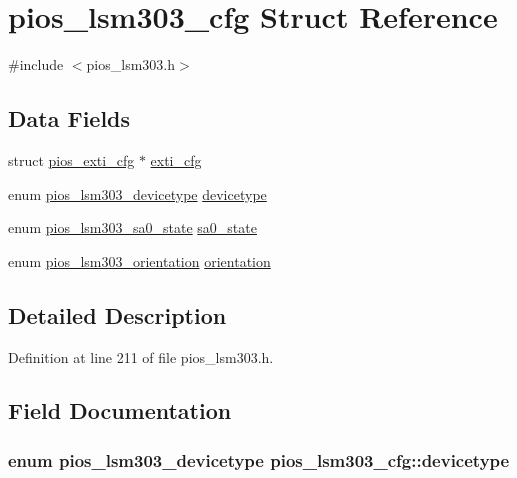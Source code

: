 \hypertarget{structpios__lsm303__cfg}{\section{pios\-\_\-lsm303\-\_\-cfg \-Struct \-Reference}
\label{structpios__lsm303__cfg}
}


{\ttfamily \#include $<$pios\-\_\-lsm303.\-h$>$}

\subsection*{\-Data \-Fields}
\begin{DoxyCompactItemize}
\item 
struct \hyperlink{structpios__exti__cfg}{pios\-\_\-exti\-\_\-cfg} $\ast$ \hyperlink{structpios__lsm303__cfg_a90c0ca7937453279f276d8adc5b7e82c}{exti\-\_\-cfg}
\item 
enum \hyperlink{group___p_i_o_s___l_s_m303_ga2657cfa22c98bd2d84ea7fed74fac52a}{pios\-\_\-lsm303\-\_\-devicetype} \hyperlink{structpios__lsm303__cfg_a5b16505db880f6b6b0c22b4dedb532bf}{devicetype}
\item 
enum \hyperlink{group___p_i_o_s___l_s_m303_ga73dd8a4c7039b8b41b78b88b16c510d6}{pios\-\_\-lsm303\-\_\-sa0\-\_\-state} \hyperlink{structpios__lsm303__cfg_a14bcbef91027a231f863b4629c9cdc74}{sa0\-\_\-state}
\item 
enum \hyperlink{group___p_i_o_s___l_s_m303_gaf21acd6da6d1a83963ba1b7a45937cfc}{pios\-\_\-lsm303\-\_\-orientation} \hyperlink{structpios__lsm303__cfg_a53a64d5c1d513bda3033f35b41a5afcc}{orientation}
\end{DoxyCompactItemize}


\subsection{\-Detailed \-Description}


\-Definition at line 211 of file pios\-\_\-lsm303.\-h.



\subsection{\-Field \-Documentation}
\hypertarget{structpios__lsm303__cfg_a5b16505db880f6b6b0c22b4dedb532bf}{
\subsubsection[{devicetype}]{\setlength{\rightskip}{0pt plus 5cm}enum {\bf pios\-\_\-lsm303\-\_\-devicetype} {\bf pios\-\_\-lsm303\-\_\-cfg\-::devicetype}}}\label{structpios__lsm303__cfg_a5b16505db880f6b6b0c22b4dedb532bf}


